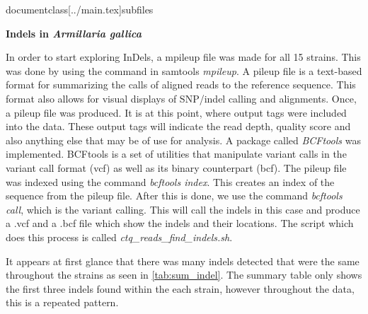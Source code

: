 documentclass[../main.tex]{subfiles}
 

\textbf{Indels in \textit{Armillaria gallica}}

In order to start exploring InDels, a mpileup file was made for all 15 strains. This was done by using the command in samtools \textit{mpileup}. A pileup file is a text-based format for summarizing the calls of aligned reads to the reference sequence. This format also allows for visual displays of SNP/indel calling and alignments. Once, a pileup file was produced. It is at this point, where output tags were included into the data. These output tags will indicate the read depth, quality score and also anything else that may be of use for analysis.  A package called \textit{BCFtools} was implemented. BCFtools is a set of utilities that manipulate variant calls in the variant call format (vcf) as well as its binary counterpart (bcf). The pileup file was indexed using the command \textit{bcftools index}. This creates an index of the sequence from the pileup file. After this is done, we use the command \textit{bcftools call}, which is the variant calling. This will call the indels in this case and produce a .vcf and a .bcf file which show the indels and their locations. The script which does this process is called \textit{ctq_reads_find_indels.sh}. 

It appears at first glance that there was many indels detected that were the same throughout the strains as seen in \ref{tab:sum_indel}. The summary table only shows the first three indels found within the each strain, however throughout the data, this is a repeated pattern. 


